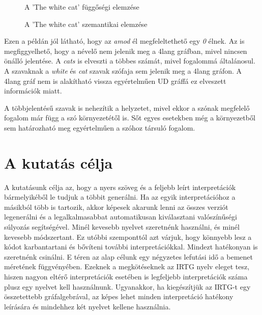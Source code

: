 \begin{figure}[h]
\centering 
{}
\caption{A 'The white cat' függőségi elemzése }
\label{fig:deptreetiny}  
\end{figure}

\begin{figure}[h]
\centering 
{}
\caption{A 'The white cat' szemantikai elemzése }
\label{fig:deptreetiny}  
\end{figure}

Ezen a példán jól látható, hogy az \textit{amod} él megfeleltethető egy \textit{0} élnek.
Az is megfiggyelhető, hogy a névelő nem jelenik meg a 4lang gráfban, mivel nincsen önálló jelentése.
A \textit{cats} is elveszti a többes számát, mivel fogalommá általánosul.
A szavaknak a \textit{white} és \textit{cat} szavak szófaja sem jelenik meg a 4lang gráfon.
A 4lang gráf nem is alakítható vissza egyértelműen UD gráffá ez elveszett információk miatt.

A többjelentésű szavak is nehezítik a helyzetet, mivel ekkor a szónak megfelelő fogalom már függ a szó környezetétől is.
Sőt egyes esetekben még a környezetből sem határozható meg egyértelműen a szóhoz társuló fogalom. 


\section{A kutatás célja}
\label{sec:goals}


A kutatásunk célja az, hogy a nyers szöveg és a feljebb leírt interpretációk bármelyikéből le tudjuk a többit generálni. Ha az egyik interpretációhoz a másikból több is tartozik, akkor képesek akarunk lenni az összes verziót legenerálni és a legalkalmasabbat automatikusan kiválasztani valószínűségi súlyozás segítségével. Minél kevesebb nyelvet szeretnénk használni, és minél kevesebb módszertant. Ez utóbbi szemponttól azt várjuk, hogy könnyebb lesz a kódot karbantartani és bővíteni további interpretációkkal. Mindezt hatékonyan is szeretnénk csinálni. E téren az alap célunk egy négyzetes lefutási idő a bemenet méretének függvényében. Ezeknek a megkötéseknek az IRTG nyelv eleget tesz, hiszen nagyon eltérő interpretációk esetében is legfeljebb interpretációk száma plusz egy nyelvet kell használnunk. Ugyanakkor, ha kiegészítjük az IRTG-t egy összetettebb gráfalgebrával, az képes lehet minden interpretáció hatékony leírására és mindehhez két nyelvet kellene használnia.

